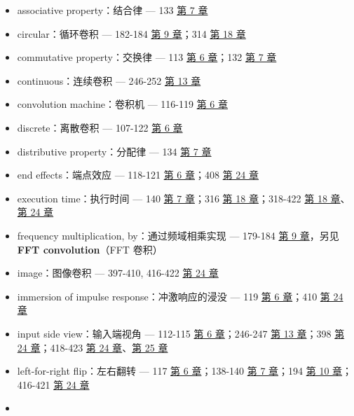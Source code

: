 \begin{itemize}
  \begin{itemize}
  \tightlist
  \item
    associative property：结合律 --- 133  \hyperref[ch-07]{第
    7 章}
  \item
    circular：循环卷积 --- 182-184  \hyperref[ch-09]{第 9
    章}；314  \hyperref[ch-18]{第 18 章}
  \item
    commutative property：交换律 --- 113  \hyperref[ch-06]{第
    6 章}；132  \hyperref[ch-07]{第 7 章}
  \item
    continuous：连续卷积 --- 246-252  \hyperref[ch-13]{第 13
    章}
  \item
    convolution machine：卷积机 --- 116-119 
    \hyperref[ch-06]{第 6 章}
  \item
    discrete：离散卷积 --- 107-122  \hyperref[ch-06]{第 6 章}
  \item
    distributive property：分配律 --- 134  \hyperref[ch-07]{第
    7 章}
  \item
    end effects：端点效应 --- 118-121  \hyperref[ch-06]{第 6
    章}；408  \hyperref[ch-24]{第 24 章}
  \item
    execution time：执行时间 --- 140  \hyperref[ch-07]{第 7
    章}；316  \hyperref[ch-18]{第 18 章}；318-422 
    \hyperref[ch-18]{第 18 章}、\hyperref[ch-24]{第 24 章}
  \item
    frequency multiplication, by：通过频域相乘实现 --- 179-184
     \hyperref[ch-09]{第 9 章}，另见 \textbf{FFT
    convolution}（FFT 卷积）
  \item
    image：图像卷积 --- 397-410, 416-422  \hyperref[ch-24]{第
    24 章}
  \item
    immersion of impulse response：冲激响应的浸没 --- 119 
    \hyperref[ch-06]{第 6 章}；410  \hyperref[ch-24]{第 24 章}
  \item
    input side view：输入端视角 --- 112-115 
    \hyperref[ch-06]{第 6 章}；246-247  \hyperref[ch-13]{第 13
    章}；398  \hyperref[ch-24]{第 24 章}；418-423 
    \hyperref[ch-24]{第 24 章}、\hyperref[ch-25]{第 25 章}
  \item
    left-for-right flip：左右翻转 --- 117  \hyperref[ch-06]{第
    6 章}；138-140  \hyperref[ch-07]{第 7 章}；194 
    \hyperref[ch-10]{第 10 章}；416-421  \hyperref[ch-24]{第
    24 章}
  \item

\end{itemize}
\end{itemize}
